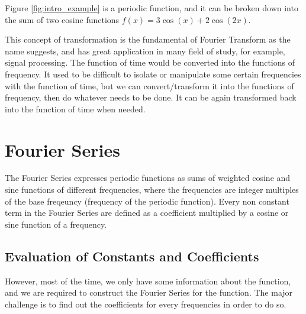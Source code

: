 \documentclass[12pt]{article}
\begin{document}
\indent Figure \ref{fig:intro_example} is a periodic function, and it can be broken down into 
the sum of two cosine functions $f(x)=3\cos(x)+2\cos(2x)$.  %

This concept of transformation is the fundamental of Fourier Transform as the name suggests,
and has great application in many field of study, for example, signal processing. 
The function of time would be converted into the functions of frequency. 
It used to be difficult to isolate or manipulate some certain frequencies with the function of time, 
but we can convert/transform it into the functions of frequency, then do whatever needs to be done. 
It can be again transformed back into the function of time when needed.












\section{Fourier Series}
\indent The Fourier Series expresses periodic functions as 
sums of weighted cosine and sine functions of different frequencies, 
where the frequencies are integer multiples of the base freqeuncy (frequency of the periodic function).
Every non constant term in the Fourier Series are defined as 
a coefficient multiplied by a cosine or sine function of a frequency.

\subsection{Evaluation of Constants and Coefficients}
\indent However, most of the time, we only have some information about the function, 
and we are required to construct the Fourier Series for the function. 
The major challenge is to find out the coefficients for every frequencies in order to do so.
\end{document}
